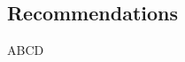 \subsection{Recommendations}

\begin{frame}[t]{ABCD}
    \small
    \justifying
    \space
\end{frame}